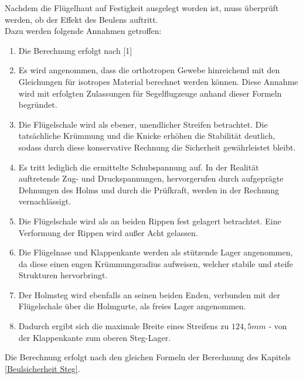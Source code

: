 Nachdem die Flügelhaut auf Festigkeit ausgelegt worden ist, muss überprüft werden, ob der Effekt des Beulens auftritt.\\

\noindent Dazu werden folgende Annahmen getroffen:

\begin{enumerate}
	\item Die Berechnung erfolgt nach [1]
	\item Es wird angenommen, dass die orthotropen Gewebe hinreichend mit den Gleichungen für isotropes Material berechnet werden können. Diese Annahme wird mit erfolgten Zulassungen für Segelflugzeuge anhand dieser Formeln begründet.
	\item Die Flügelschale wird als ebener, unendlicher Streifen betrachtet. Die tatsächliche Krümmung und die Knicke erhöhen die Stabilität deutlich, sodass durch diese konservative Rechnung die Sicherheit gewährleistet bleibt.
	\item Es tritt lediglich die ermittelte Schubspannung auf. In der Realität auftretende Zug- und Druckspannungen, hervorgerufen durch aufgeprägte Dehnungen des Holms und durch die Prüfkraft, werden in der Rechnung vernachlässigt.
	\item Die Flügelschale wird als an beiden Rippen fest gelagert betrachtet. Eine Verformung der Rippen wird außer Acht gelassen.
	\item Die Flügelnase und Klappenkante werden als stützende Lager angenommen, da diese einen engen Krümmungsradius aufweisen, welcher stabile und steife Strukturen hervorbringt.
	\item Der Holmsteg wird ebenfalls an seinen beiden Enden, verbunden mit der Flügelschale über die Holmgurte, als freies Lager angenommen.
	\item Dadurch ergibt sich die maximale Breite eines Streifens zu $124,5 mm$ - von der Klappenkante zum oberen Steg-Lager.
\end{enumerate}

\noindent Die Berechnung erfolgt nach den gleichen Formeln der Berechnung des Kapitels \ref{Beulsicherheit Steg}.\\

